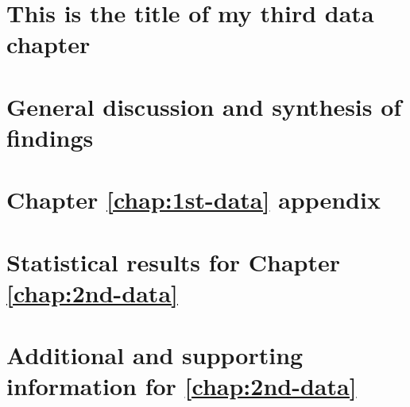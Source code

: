 \documentclass[12pt, a4paper, twoside, openright, final]{report}
\begin{document}
\chapter{This is the title of my third data chapter
        }\label{chap:3rd-data}

    
\chapter{General discussion and synthesis of findings
        }\label{chap:gen-disc}



\printbibliography

\printindex


\chapter{Chapter \ref{chap:1st-data} appendix
        }\label{app:A1_app_name}


\chapter{Statistical results for Chapter \ref{chap:2nd-data}
        }\label{app:A2_app_name}


\chapter{Additional and supporting information for \ref{chap:2nd-data}
        }\label{app:A3_app_name}

\end{document}
